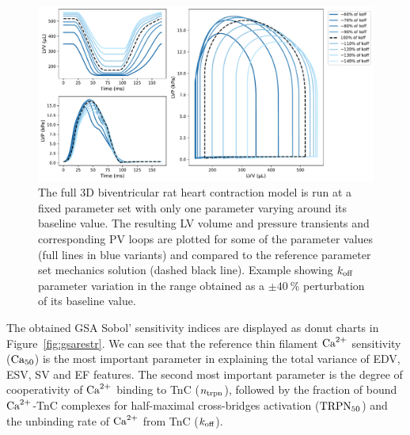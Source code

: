 \begin{figure}[h!]
    \myfloatalign
    \includegraphics[width=\textwidth]{figures/chapter08/Fig2.pdf}
    \caption{The full $3$D biventricular rat heart contraction model is run at a fixed parameter set with only one parameter varying around its baseline value. The resulting LV volume and pressure transients and corresponding PV loops are plotted for some of the parameter values (full lines in blue variants) and compared to the reference parameter set mechanics solution (dashed black line). Example showing $k_{\textrm{off}}$ parameter variation in the range obtained as a $\pm\SI{40}{\percent}$ perturbation of its baseline value.}
    \label{fig:EFvskoff}
\end{figure}

\vspace{0.2cm}
The obtained GSA Sobol' sensitivity indices are displayed as donut charts in Figure~\ref{fig:gsarestr}. We can see that the reference thin filament $\textrm{Ca}^{2+}$ sensitivity ($\textrm{Ca}_{50}$) is the most important parameter in explaining the total variance of EDV, ESV, SV and EF features. The second most important parameter is the degree of cooperativity of $\textrm{Ca}^{2+}$ binding to TnC ($n_{\textrm{trpn}}$), followed by the fraction of bound $\textrm{Ca}^{2+}$-TnC complexes for half-maximal cross-bridges activation ($\textrm{TRPN}_{50}$) and the unbinding rate of $\textrm{Ca}^{2+}$ from TnC ($k_{\textrm{off}}$).

